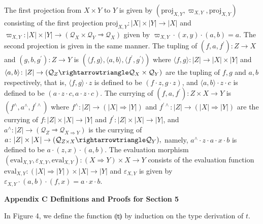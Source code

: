 The first projection from $X\times Y$ to $Y$ is given by $(\mathrm{proj}_{X,Y},\varpi_{X,Y},\mathrm{proj}_{X,Y})$ consisting of the first projection $\mathrm{proj}_{X,Y}\colon|X|\times|Y|\to|X|$ and $\varpi_{X,Y}\colon|X|\times|Y|\to(\mathcal{Q}_{X}\times\mathcal{Q}_{Y}%
\rightarrowtriangle\mathcal{Q}_{X})$ given by $\varpi_{X,Y}\cdot(x,y)\cdot(a,b)=a$. The second projection is given in the same manner. The tupling of $(f,a,f^{\prime})\colon Z\to X$ and $(g,b,g^{\prime})\colon Z\to Y$ is $(\langle f,g\rangle,\langle a,b\rangle,\langle f^{\prime},g^{\prime}\rangle)$ where $\langle f,g\rangle\colon|Z|\to|X|\times|Y|$ and $\langle a,b\rangle\colon|Z|\to(\mathcal{Q}_{Z}\rightarrowtriangle\mathcal{Q}_{%
X}\times\mathcal{Q}_{Y})$ are the tupling of $f,g$ and $a,b$ respectively, that is, $\langle f,g\rangle\cdot z$ is defined to be $(f\cdot z,g\cdot z)$, and $\langle a,b\rangle\cdot z\cdot c$ is defined to be $(a\cdot z\cdot c,a\cdot z\cdot c)$. The currying of $(f,a,f^{\prime})\colon Z\times X\to Y$ is $(f^{\wedge},a^{\wedge},f^{\prime\wedge})$ where $f^{\wedge}\colon|Z|\to(|X|\Rightarrow|Y|)$ and $f^{\prime\wedge}\colon|Z|\to(|X|\Rightarrow|Y|)$ are the currying of $f\colon|Z|\times|X|\to|Y|$ and $f^{\prime}\colon|Z|\times|X|\to|Y|$, and $a^{\wedge}\colon|Z|\to(\mathcal{Q}_{Z}\rightarrowtriangle\mathcal{Q}_{X%
\Rightarrow Y})$ is the currying of $a\colon|Z|\times|X|\to(\mathcal{Q}_{Z\times X}\rightarrowtriangle\mathcal{Q}_{%
Y}),$ namely, $a^{\wedge}\cdot z\cdot a\cdot x\cdot b$ is defined to be $a\cdot(z,x)\cdot(a,b)$. The evaluation morphism $(\mathrm{eval}_{X,Y},\varepsilon_{X,Y},\mathrm{eval}_{X,Y})\colon(X\Rightarrow
Y%
)\times X\to Y$ consists of the evaluation function $\mathrm{eval}_{X,Y}\colon(|X|\Rightarrow|Y|)\times|X|\to|Y|$ and $\varepsilon_{X,Y}$ is given by $\varepsilon_{X,Y}\cdot(a,b)\cdot(f,x)=a\cdot x\cdot b.$\par
 
 


 
\par\medskip\noindent\textbf{Appendix C Definitions and Proofs for Section 5}\par
 
 
In Figure 4, we define the function $\llparenthesis\mathsf{t}\rrparenthesis$ by induction on the type derivation of $t$.\par
 
 
